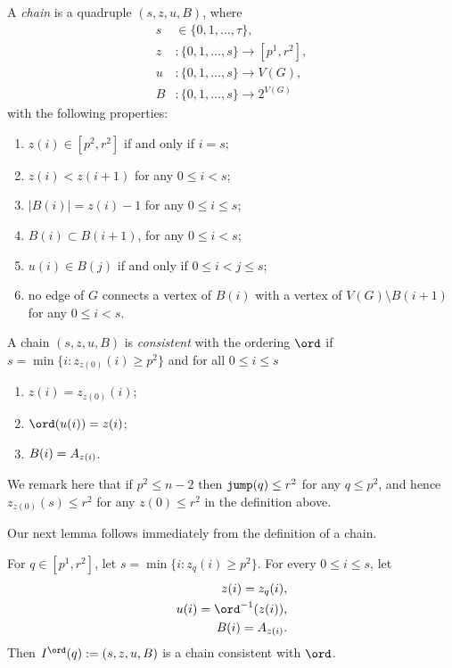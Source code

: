\begin{definition}[chain]
A \emph{chain} is a quadruple $(s,z,u,B)$, where
\begin{align*}
s &\in \{0,1,\ldots,\tau\}, \\
z &: \{0,1,\ldots,s\} \to [p^1,r^2], \\
u &: \{0,1,\ldots,s\} \to V(G), \\
B &: \{0,1,\ldots,s\} \to 2^{V(G)}
\end{align*}
with the following properties:
\begin{enumerate}
\item $z(i) \in [p^2,r^2]$ if and only if $i = s$;
\item $z(i) < z(i+1)$ for any $0 \leq i < s$;
\item $|B(i)| = z(i)-1$ for any $0 \leq i \leq s$;
\item $B(i) \subset B(i+1)$, for any $0 \leq i < s$;
\item $u(i) \in B(j)$ if and only if $0 \leq i < j \leq s$;
\item no edge of $G$ connects a vertex of $B(i)$ with a vertex
of $V(G) \setminus B(i+1)$ for any $0 \leq i < s$.
\end{enumerate}
A chain $(s,z,u,B)$ is \emph{consistent} with the ordering $\ord$
if $s = \min\{i: z_{z(0)}(i) \geq p^2\}$ and for all $0 \leq i \leq s$
\begin{enumerate}
\item $z(i) = z_{z(0)}(i)$;
\item $\ord(u(i)) = z(i)$;
\item $B(i) = A_{z(i)}$.
\end{enumerate}
\end{definition}

We remark here that if $p^2 \leq n-2$ then $\mathtt{jump}(q) \leq r^2$ for any $q \leq p^2$, and hence $z_{z(0)}(s) \leq r^2$ 
for any $z(0) \leq r^2$ in the definition above.

Our next lemma follows immediately  from the definition of a chain.
\begin{lemma}\label{lem:ord-to-chain}
For  $q \in [p^1,r^2]$, let $s = \min \{i: z_q(i) \geq p^2\}$. For every $0 \leq i \leq s$, let 
\begin{align*}
z(i)  =  z_q(i),\\
u(i) = \ord^{-1}(z(i)) ,\\
B(i) = \secp{z(i)} .
\end{align*}
Then $I^\ord(q) := (s,z,u,B)$ is a chain consistent with $\ord$.

\end{lemma}

